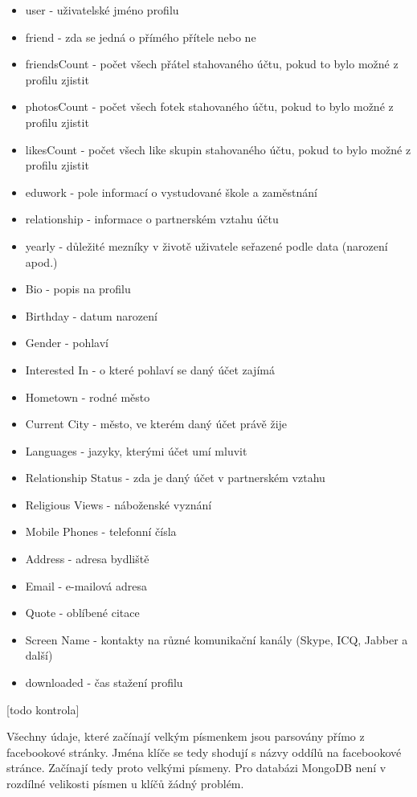 \documentclass[thesis=M,czech]{FITthesis}[2013/05/10]
\begin{document}
\begin{itemize}
  \item user - uživatelské jméno profilu
  \item friend - zda se jedná o přímého přítele nebo ne
  \item friendsCount - počet všech přátel stahovaného účtu, pokud to bylo možné z profilu zjistit
  \item photosCount - počet všech fotek stahovaného účtu, pokud to bylo možné z profilu zjistit
  \item likesCount - počet všech like skupin stahovaného účtu, pokud to bylo možné z profilu zjistit
  \item eduwork - pole informací o vystudované škole a zaměstnání
  \item relationship - informace o partnerském vztahu účtu
  \item yearly - důležité mezníky v životě uživatele seřazené podle data (narození apod.)
  \item Bio - popis na profilu
  \item Birthday - datum narození 
  \item Gender - pohlaví
  \item Interested In - o které pohlaví se daný účet zajímá
  \item Hometown - rodné město
  \item Current City - město, ve kterém daný účet právě žije
  \item Languages - jazyky, kterými účet umí mluvit
  \item Relationship Status - zda je daný účet v partnerském vztahu
  \item Religious Views - náboženské vyznání
  \item Mobile Phones - telefonní čísla
  \item Address - adresa bydliště
  \item Email - e-mailová adresa
  \item Quote - oblíbené citace
  \item Screen Name - kontakty na různé komunikační kanály (Skype, ICQ, Jabber a další)
  \item downloaded - čas stažení profilu
\end{itemize}
[todo kontrola]

Všechny údaje, které začínají velkým písmenkem jsou parsovány přímo z facebookové stránky. Jména klíče se tedy shodují s názvy oddílů na facebookové stránce. Začínají tedy proto velkými písmeny. Pro databázi MongoDB není v rozdílné velikosti písmen u klíčů žádný problém.
\end{document}
